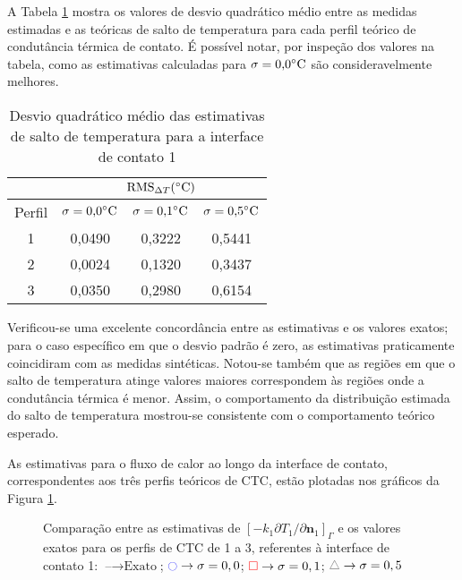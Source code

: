 A Tabela \ref{tabela_rms_delta_temperaturas_interface_1} mostra os valores de desvio quadrático médio entre as medidas estimadas e as teóricas de salto de temperatura para cada perfil teórico de condutância térmica de contato. É possível notar, por inspeção dos valores na tabela, como as estimativas calculadas para $\sigma = \text{0,0}\celsius$ são consideravelmente melhores.
\begin{table}[H]
	\centering
	\caption{Desvio quadrático médio das estimativas de salto de temperatura para a interface de contato 1}
	\begin{tabular}{c|c|c|c|}
		\cline{2-4}
		& \multicolumn{3}{c|}{$\text{RMS}_{\Delta T} (\celsius)$} \\ \hline
		\multicolumn{1}{|c|}{Perfil} & $\sigma = \text{0,0}\celsius$   & $\sigma = \text{0,1}\celsius$    & $\sigma = \text{0,5}\celsius$  \\ \hline
		\multicolumn{1}{|c|}{1}      &  0,0490      & 0,3222       & 0,5441       \\ \hline
		\multicolumn{1}{|c|}{2}      &  0,0024      & 0,1320       & 0,3437      \\ \hline
		\multicolumn{1}{|c|}{3}      &  0,0350      & 0,2980       & 0,6154      \\ \hline
	\end{tabular}
	\label{tabela_rms_delta_temperaturas_interface_1}
\end{table}

Verificou-se uma excelente concordância entre as estimativas e os valores exatos; para o caso específico em que o desvio padrão é zero, as estimativas praticamente coincidiram com as medidas sintéticas. Notou-se também que as regiões em que o salto de temperatura atinge valores maiores correspondem às regiões onde a condutância térmica é menor. Assim, o comportamento da distribuição estimada do salto de temperatura mostrou-se consistente com o comportamento teórico esperado.

As estimativas para o fluxo de calor ao longo da interface de contato, correspondentes aos três perfis teóricos de CTC, estão plotadas nos gráficos da Figura \ref{figura_fluxo_calor_interface_01}.  
\begin{figure}[H]
	\caption{Comparação entre as estimativas de $[-k_1 {\partial T_1}/{\partial\mathbf{n}_1}]_\Gamma$ e os valores exatos para os perfis de CTC de 1 a 3, referentes à interface de contato 1: $\text{--} \rightarrow \text{Exato}$; $\textcolor{blue}{\ocircle} \rightarrow \sigma = 0,0$; $\textcolor{red}{\square} \rightarrow \sigma = 0,1$; $\textcolor{gray}{\triangle} \rightarrow \sigma = 0,5$}
	\label{figura_fluxo_calor_interface_01}
\end{figure}

